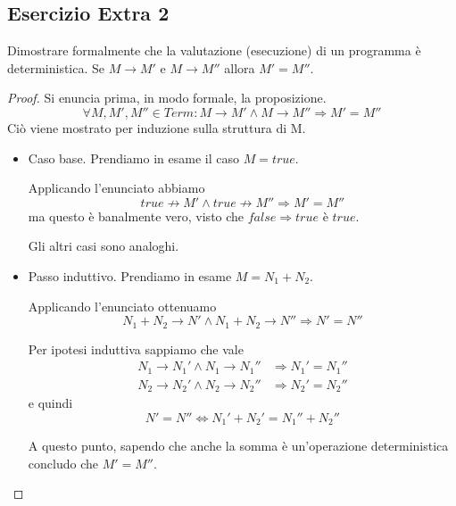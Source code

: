 \documentclass[12pt,a4paper,oneside]{book}
\begin{document}
\subsection{Esercizio Extra 2}

\begin{exercise}
    Dimostrare formalmente che la valutazione (esecuzione) di un
    programma è deterministica. Se $M \to M'$ e $M \to M''$ allora $M'
    = M''$.

    \begin{proof}
        Si enuncia prima, in modo formale, la proposizione.
        \[
        \forall M, M', M'' \in Term: M \to M' \land M \to M'' \Rightarrow M' = M''
        \]
        Ciò viene mostrato per induzione sulla struttura di M.

        \begin{itemize}
            \item Caso base. Prendiamo in esame il caso $M = true$.

            Applicando l'enunciato abbiamo
            \[
            true \not\to M' \land true \not\to M'' \Rightarrow M' = M''
            \]
            ma questo è banalmente vero, visto che $false \Rightarrow
            true$ è $true$.

            Gli altri casi sono analoghi.

            \item Passo induttivo. Prendiamo in esame $M = N_1 + N_2$.

            Applicando l'enunciato ottenuamo
            \[
            N_1 + N_2 \to N' \land N_1 + N_2 \to N'' \Rightarrow N' = N''
            \]

            Per ipotesi induttiva sappiamo che vale
            \begin{equation*}
            \begin{split}
            N_1 \to N_1' \land N_1 \to N_1'' & \Rightarrow N_1' = N_1'' \\
            N_2 \to N_2' \land N_2 \to N_2'' & \Rightarrow N_2' = N_2''
            \end{split}
            \end{equation*}
            e quindi
            \[
            N' = N'' \Leftrightarrow N_1' + N_2' = N_1'' + N_2''
            \]

            A questo punto, sapendo che anche la somma è un'operazione
            deterministica concludo che $M' = M''$.
        \end{itemize}
    \end{proof}
\end{exercise}
\end{document}
